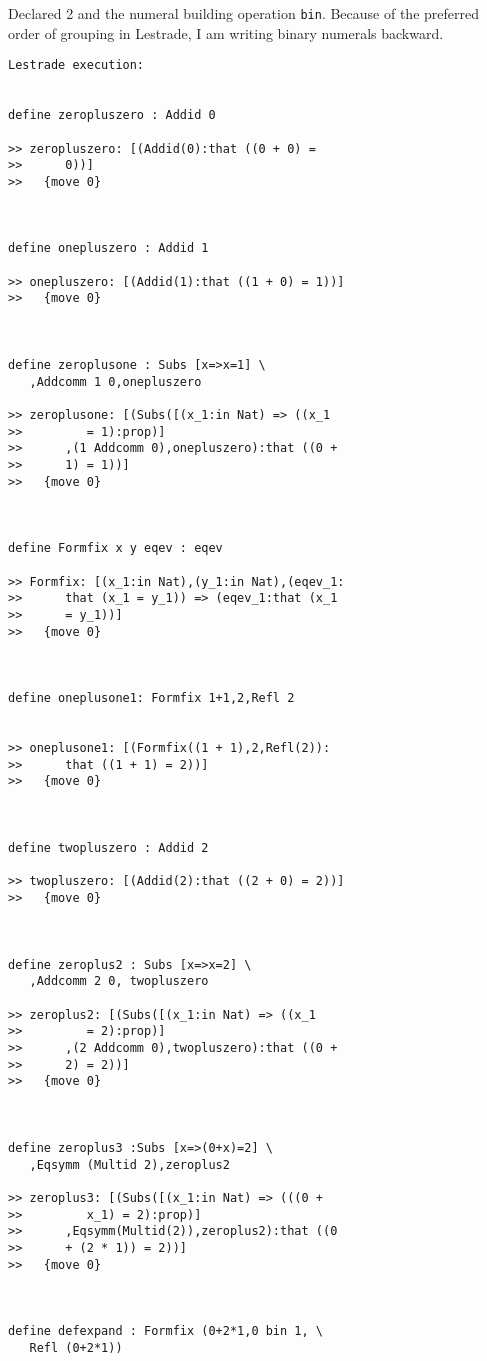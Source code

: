\documentclass{article}
\begin{document}
Declared 2 and the numeral building operation {\tt bin}.  Because of the preferred order of grouping in Lestrade, I am writing binary numerals backward.

\begin{verbatim}Lestrade execution:


define zeropluszero : Addid 0

>> zeropluszero: [(Addid(0):that ((0 + 0) =
>>      0))]
>>   {move 0}



define onepluszero : Addid 1

>> onepluszero: [(Addid(1):that ((1 + 0) = 1))]
>>   {move 0}



define zeroplusone : Subs [x=>x=1] \
   ,Addcomm 1 0,onepluszero

>> zeroplusone: [(Subs([(x_1:in Nat) => ((x_1
>>         = 1):prop)]
>>      ,(1 Addcomm 0),onepluszero):that ((0 +
>>      1) = 1))]
>>   {move 0}



define Formfix x y eqev : eqev

>> Formfix: [(x_1:in Nat),(y_1:in Nat),(eqev_1:
>>      that (x_1 = y_1)) => (eqev_1:that (x_1
>>      = y_1))]
>>   {move 0}



define oneplusone1: Formfix 1+1,2,Refl 2


>> oneplusone1: [(Formfix((1 + 1),2,Refl(2)):
>>      that ((1 + 1) = 2))]
>>   {move 0}



define twopluszero : Addid 2

>> twopluszero: [(Addid(2):that ((2 + 0) = 2))]
>>   {move 0}



define zeroplus2 : Subs [x=>x=2] \
   ,Addcomm 2 0, twopluszero

>> zeroplus2: [(Subs([(x_1:in Nat) => ((x_1
>>         = 2):prop)]
>>      ,(2 Addcomm 0),twopluszero):that ((0 +
>>      2) = 2))]
>>   {move 0}



define zeroplus3 :Subs [x=>(0+x)=2] \
   ,Eqsymm (Multid 2),zeroplus2

>> zeroplus3: [(Subs([(x_1:in Nat) => (((0 +
>>         x_1) = 2):prop)]
>>      ,Eqsymm(Multid(2)),zeroplus2):that ((0
>>      + (2 * 1)) = 2))]
>>   {move 0}



define defexpand : Formfix (0+2*1,0 bin 1, \
   Refl (0+2*1))


\end{verbatim}
\end{document}
